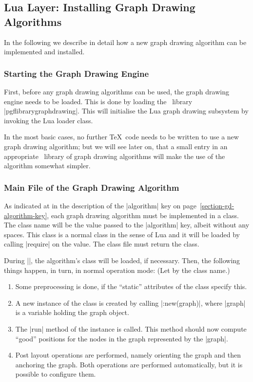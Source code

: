 \subsection{Lua Layer: Installing Graph Drawing Algorithms}
\label{section-gd-implementing-algorithms}

In the following we describe in detail how a new graph drawing
algorithm can be implemented and installed. 


\subsubsection{Starting the Graph Drawing Engine}

First, before any graph drawing algorithms can be used, the graph
drawing engine needs to be loaded. This is done by loading the
\pgfname\ library |pgflibrarygraphdrawing|. This will
initialise the Lua graph drawing subsystem by invoking the Lua loader
class.   

In the most basic cases, no further \TeX\ code needs to be written to
use a new graph drawing algorithm; but we will see later on, that a
small entry in an appropriate \pgfname\ library of graph drawing
algorithms will make the use of the algorithm somewhat simpler.


\subsubsection{Main File of the Graph Drawing Algorithm}

As indicated at in the description of the |algorithm| key on
page~\ref{section-gd-algorithm-key}, each graph drawing algorithm  
must be implemented in a class. The class name will be the value
passed to the |algorithm| key, albeit without any spaces. This class
is a normal class in the sense of Lua and it will be loaded by calling
|require| on the value. The class file must return the class.

During |\pgfgdendscope|, the algorithm's class will be loaded, if
necessary. Then, the following things happen, in turn, in normal
operation mode: (Let  by the class name.)

\begin{enumerate}
\item Some preprocessing is done, if the ``static'' attributes of the
  class specify this.
\item A new instance of the class is created by calling
  |:new(graph)|, where |graph| is a variable holding the
  graph object. 
\item The |run| method of the instance is called. This method should now
  compute ``good'' positions for the nodes in the graph represented by
  the |graph|.
\item Post layout operations are performed, namely orienting the
  graph and then anchoring the graph. Both operations are performed
  automatically, but it is possible to configure them.
\end{enumerate}

